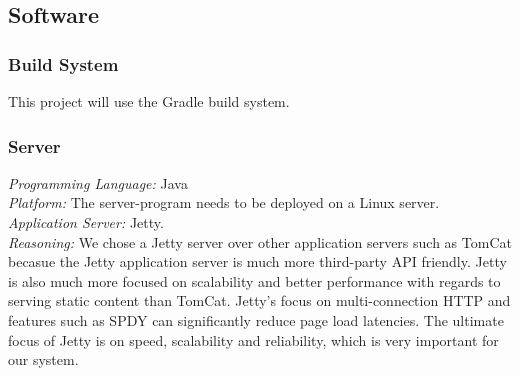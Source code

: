\subsection{Software}

\subsubsection{Build System}
This project will use the Gradle build system.

\subsubsection{Server}
\textit{Programming Language:} Java \\
\textit{Platform:} The server-program needs to be deployed on a Linux server.\\
\textit{Application Server:} Jetty.\\
\textit{Reasoning: } We chose a Jetty server over other application servers such as TomCat becasue the Jetty application server is much more third-party API friendly. Jetty is also much more focused on scalability and better performance with regards to serving static content than TomCat. Jetty's focus on multi-connection HTTP and features such as SPDY can significantly reduce page load latencies. The ultimate focus of Jetty is on speed, scalability and reliability, which is very important for our system.

